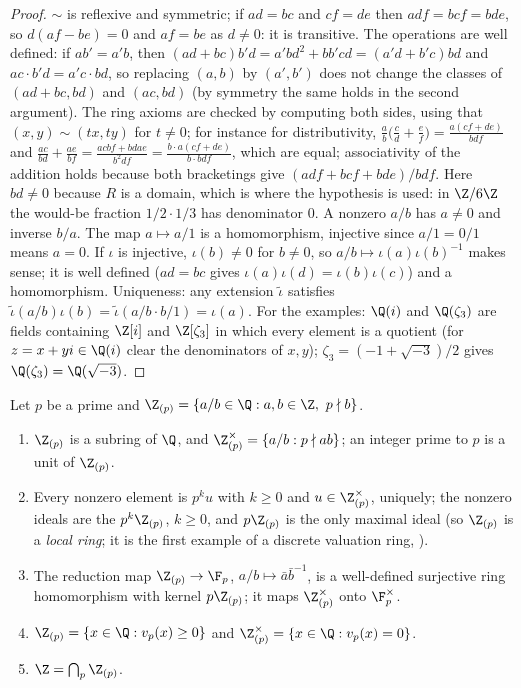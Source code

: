 \begin{proof}
$\sim$ is reflexive and symmetric; if $ad=bc$ and $cf=de$ then $adf=bcf=bde$, so $d(af-be)=0$ and $af=be$ as $d\ne0$: it is
transitive. The operations are well defined: if $ab'=a'b$, then $(ad+bc)b'd=a'bd^2+bb'cd=(a'd+b'c)bd$ and $ac\cdot b'd=a'c\cdot bd$, so replacing $(a,b)$ by
$(a',b')$ does not change the classes of $(ad+bc,bd)$ and $(ac,bd)$ (by symmetry the same holds in the second argument). The ring axioms are
checked by computing both sides, using that $(x,y)\sim(tx,ty)$ for $t\ne0$; for instance for distributivity,
$\frac ab\bigl(\frac cd+\frac ef\bigr)=\frac{a(cf+de)}{bdf}$ and $\frac{ac}{bd}+\frac{ae}{bf}=\frac{acbf+bdae}{b^2df}=\frac{b\cdot a(cf+de)}{b\cdot bdf}$, which are equal; associativity of
the addition holds because both bracketings give $(adf+bcf+bde)/bdf$. Here $bd\ne0$ because $R$ is a domain, which is where the
hypothesis is used: in $\Z/6\Z$ the would-be fraction $1/2\cdot1/3$ has denominator $0$. A nonzero $a/b$ has $a\ne0$ and inverse $b/a$. The map
$a\mapsto a/1$ is a homomorphism, injective since $a/1=0/1$ means $a=0$. If $\iota$ is injective, $\iota(b)\ne0$ for $b\ne0$, so
$a/b\mapsto\iota(a)\iota(b)^{-1}$ makes sense; it is well defined ($ad=bc$ gives $\iota(a)\iota(d)=\iota(b)\iota(c)$) and a homomorphism.
Uniqueness: any extension $\tilde\iota$ satisfies $\tilde\iota(a/b)\iota(b)=\tilde\iota(a/b\cdot b/1)=\iota(a)$. For the examples: $\Q(i)$ and
$\Q(\zeta_3)$ are fields containing $\Z[i]$ and $\Z[\zeta_3]$ in which every element is a quotient (for $z=x+yi\in\Q(i)$ clear the
denominators of $x,y$); $\zeta_3=(-1+\sqrt{-3})/2$ gives $\Q(\zeta_3)=\Q(\sqrt{-3})$.
\end{proof}

\begin{proposition}\label{prop:rings:zp-local}
Let $p$ be a prime and $\Z_{(p)}=\{a/b\in\Q:a,b\in\Z,\ p\nmid b\}$.
\begin{enumerate}[label=(\roman*)]
\item $\Z_{(p)}$ is a subring of $\Q$, and $\Z_{(p)}^\times=\{a/b:p\nmid ab\}$; an integer prime to $p$ is a unit of $\Z_{(p)}$.
\item Every nonzero element is $p^ku$ with $k\ge0$ and $u\in\Z_{(p)}^\times$, uniquely; the nonzero ideals are the $p^k\Z_{(p)}$, $k\ge0$, and
$p\Z_{(p)}$ is the only maximal ideal (so $\Z_{(p)}$ is a \emph{local ring}; it is the first example of a discrete valuation ring,
).
\item The reduction map $\Z_{(p)}\to\F_p$, $a/b\mapsto\bar a\bar b^{-1}$, is a well-defined surjective ring homomorphism with kernel
$p\Z_{(p)}$; it maps $\Z_{(p)}^\times$ onto $\F_p^\times$.
\item $\Z_{(p)}=\{x\in\Q:v_p(x)\ge0\}$ and $\Z_{(p)}^\times=\{x\in\Q:v_p(x)=0\}$.
\item $\Z=\bigcap_p\Z_{(p)}$.
\end{enumerate}
\end{proposition}

